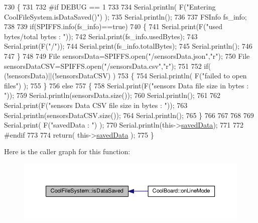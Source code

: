 \begin{DoxyCode}
730 \{
731 
732 \textcolor{preprocessor}{#if DEBUG == 1 }
733 
734     Serial.println( F(\textcolor{stringliteral}{"Entering CoolFileSystem.isDataSaved()"}) );
735     Serial.println();
736 
737     FSInfo fs\_info;
738 
739     \textcolor{keywordflow}{if}(SPIFFS.info(fs\_info)==\textcolor{keyword}{true})
740     \{
741         Serial.print(F(\textcolor{stringliteral}{"used bytes/total bytes : "}));   
742         Serial.print(fs\_info.usedBytes);
743         Serial.print(F(\textcolor{stringliteral}{"/"}));
744         Serial.print(fs\_info.totalBytes);
745         Serial.println();
746 
747     \}
748 
749     File sensorsData=SPIFFS.open(\textcolor{stringliteral}{"/sensorsData.json"},\textcolor{stringliteral}{"r"});
750     File sensorsDataCSV=SPIFFS.open(\textcolor{stringliteral}{"/sensorsData.csv"},\textcolor{stringliteral}{"r"});
751     
752     \textcolor{keywordflow}{if}( (!sensorsData)||(!sensorsDataCSV) ) 
753     \{
754         Serial.println( F(\textcolor{stringliteral}{"failed to open files"}) );        
755     \}
756     \textcolor{keywordflow}{else}
757     \{       
758             Serial.print(F(\textcolor{stringliteral}{"sensors Data file size in bytes : "}));
759             Serial.println(sensorsData.size());
760             Serial.println();
761             
762             Serial.print(F(\textcolor{stringliteral}{"sensors Data CSV file size in bytes : "}));              
763             Serial.println(sensorsDataCSV.size());
764             Serial.println();
765     \}
766 
767 
768 
769     Serial.print( F(\textcolor{stringliteral}{"savedData : "}) );
770     Serial.println(this->\hyperlink{class_cool_file_system_ad9f5b739a32100f5f21270c3d9ee2b1d}{savedData});
771 
772 \textcolor{preprocessor}{#endif}
773 
774     \textcolor{keywordflow}{return}( this->\hyperlink{class_cool_file_system_ad9f5b739a32100f5f21270c3d9ee2b1d}{savedData} );
775 \}
\end{DoxyCode}
Here is the caller graph for this function\+:\nopagebreak
\begin{figure}[H]
\begin{center}
\leavevmode
\includegraphics[width=350pt]{db/d0c/class_cool_file_system_ac86a40e7c3a1842f7342f698d34324f9_icgraph}
\end{center}
\end{figure}
\mbox{\label{class_cool_file_system_afa3a4feae94871d4d3b6bebb701c2e67}} 
